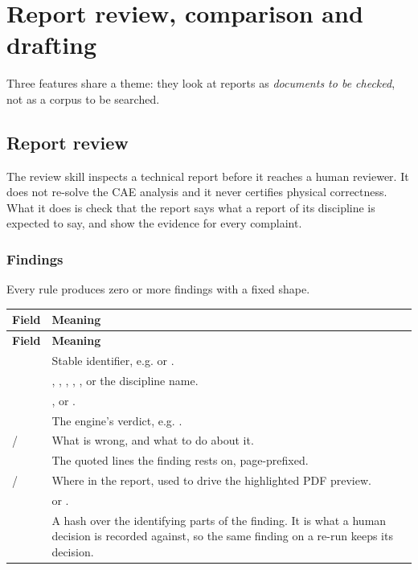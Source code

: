 \chapter{Report review, comparison and drafting}
\label{ch:review}

Three features share a theme: they look at reports as \emph{documents to be
checked}, not as a corpus to be searched.

\section{Report review}
\label{sec:report-review}

The review skill inspects a technical report before it reaches a human
reviewer. It does not re-solve the CAE analysis and it never certifies physical
correctness. What it does is check that the report says what a report of its
discipline is expected to say, and show the evidence for every complaint.

\subsection{Findings}

Every rule produces zero or more findings with a fixed shape.

\begin{longtable}{L{0.24\textwidth} L{0.66\textwidth}}
\toprule
\textbf{Field} & \textbf{Meaning} \\
\midrule
\endfirsthead
\toprule
\textbf{Field} & \textbf{Meaning} \\
\midrule
\endhead
\bottomrule
\endfoot
{} & Stable identifier, e.g.  or
. \\
 & , , ,
, , or the discipline name. \\
 & ,  or . \\
 & The engine's verdict, e.g. . \\
 /  & What is wrong, and what to do about
it. \\
 & The quoted lines the finding rests on, page-prefixed. \\
 /  & Where in the report, used to drive the
highlighted PDF preview. \\
 &  or . \\
 & A hash over the identifying parts of the finding. It is
what a human decision is recorded against, so the same finding on a re-run keeps
its decision. \\
\end{longtable}

